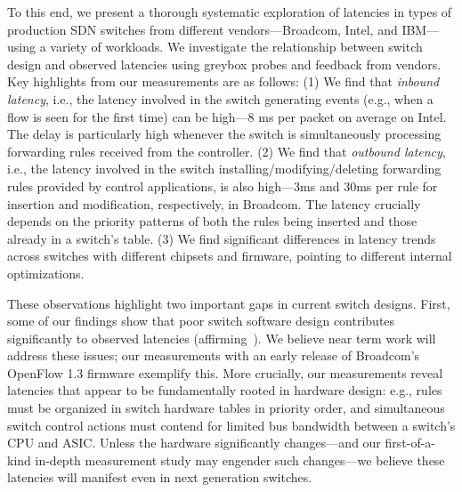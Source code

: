 
To this end, we present a thorough systematic exploration of latencies in 
\numCombos types of production SDN switches from
\numVendors different vendors---Broadcom, Intel, and IBM---using a variety
of workloads. We investigate the relationship between switch design
and observed latencies using greybox probes and feedback from
vendors. Key highlights from our measurements are as follows: (1) We
find that {\em inbound latency}, i.e., the latency involved in the
switch generating events (e.g., when a flow is seen for the first
time) can be high---8 ms per packet on average on Intel. The
delay is particularly high whenever the switch is simultaneously
processing forwarding rules received from the controller. (2) We find
that {\em outbound latency}, i.e., the latency involved in the switch
installing/modifying/deleting forwarding rules provided by control
applications, is also high---3ms and 30ms per rule for insertion and
modification, respectively, in Broadcom. The latency crucially
depends on the priority patterns of both the rules being inserted and
those already in a switch's table. (3) We find significant differences in
latency trends across switches with different chipsets and firmware, pointing
to different internal optimizations.


These observations highlight two important gaps in current switch designs.
First, some of our findings show that poor switch software design
contributes significantly to observed latencies
(affirming~\cite{ucsdpaper,oflops,ferguson2013participatory}). We believe near term work
will address these issues; our measurements with an early release of
Broadcom's OpenFlow 1.3 firmware exemplify this. More crucially, our
measurements reveal latencies that appear to
be fundamentally rooted in hardware design: e.g., rules must be
organized in switch hardware tables in priority order, and
simultaneous switch control actions must contend for limited bus
bandwidth between a switch's CPU and ASIC. Unless the hardware
significantly changes---and our first-of-a-kind 
in-depth measurement study may engender such changes---we believe these latencies will
manifest even in next generation switches.

